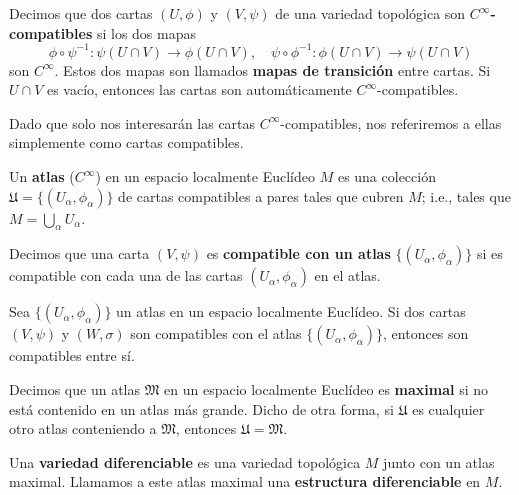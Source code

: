 \begin{definition}
	Decimos que dos cartas $(U,\phi)$ y $(V, \psi)$ de una variedad topológica son $C^{\infty}$\textbf{-compatibles} si los dos mapas
	\[ \phi \circ \psi^{-1} \colon \psi(U \cap V) \to \phi(U \cap V), \quad \psi \circ \phi^{-1} \colon \phi(U \cap V) \to \psi(U \cap V) \]
	son $C^{\infty}$. Estos dos mapas son llamados \textbf{mapas de transición} entre cartas. Si $U \cap V$ es vacío, entonces las cartas son automáticamente $C^{\infty}$-compatibles.
\end{definition}

Dado que solo nos interesarán las cartas $C^{\infty}$-compatibles, nos referiremos a ellas simplemente como cartas compatibles.

\begin{definition}
	Un \textbf{atlas} ($C^{\infty}$) en un espacio localmente Euclídeo $M$ es una colección $\mathfrak{U} = \{ (U_{\alpha}, \phi_{\alpha}) \}$ de cartas compatibles a pares tales que cubren $M$; i.e., tales que $M = \bigcup_{\alpha} U_{\alpha}$.
\end{definition}

\begin{definition}
	Decimos que una carta $(V, \psi)$ es \textbf{compatible con un atlas} $\{ (U_{\alpha}, \phi_{\alpha}) \}$ si es compatible con cada una de las cartas $(U_{\alpha}, \phi_{\alpha})$ en el atlas.
\end{definition}

\begin{lemma}
	Sea $\{ (U_{\alpha}, \phi_{\alpha}) \}$ un atlas en un espacio localmente Euclídeo. Si dos cartas $(V, \psi)$ y $(W, \sigma)$ son compatibles con el atlas $\{ (U_{\alpha}, \phi_{\alpha}) \}$, entonces son compatibles entre sí.
\end{lemma}

\begin{definition}
	Decimos que un atlas $\mathfrak{M}$ en un espacio localmente Euclídeo es \textbf{maximal} si no está contenido en un atlas más grande. Dicho de otra forma, si $\mathfrak{U}$ es cualquier otro atlas conteniendo a $\mathfrak{M}$, entonces $\mathfrak{U} = \mathfrak{M}$.
\end{definition}

\begin{definition}
	Una \textbf{variedad diferenciable} es una variedad topológica $M$ junto con un atlas maximal. Llamamos a este atlas maximal una \textbf{estructura diferenciable} en $M$.
\end{definition}

